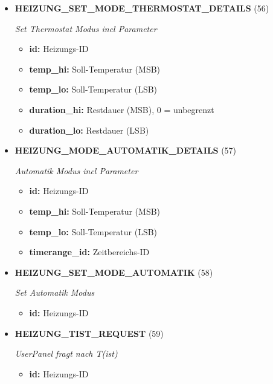 \begin{itemize}
\item \textbf{HEIZUNG\_SET\_MODE\_THERMOSTAT\_DETAILS} (56)

\textit{Set Thermostat Modus incl Parameter}

\small
\begin{itemize}
		
\item \textbf{id:} Heizungs-ID
\item \textbf{temp\_hi:} Soll-Temperatur (MSB)
\item \textbf{temp\_lo:} Soll-Temperatur (LSB)
\item \textbf{duration\_hi:} Restdauer (MSB), 0 = unbegrenzt
\item \textbf{duration\_lo:} Restdauer (LSB)
\end{itemize}
\normalsize
	
\item \textbf{HEIZUNG\_MODE\_AUTOMATIK\_DETAILS} (57)

\textit{Automatik Modus incl Parameter}

\small
\begin{itemize}
		
\item \textbf{id:} Heizungs-ID
\item \textbf{temp\_hi:} Soll-Temperatur (MSB)
\item \textbf{temp\_lo:} Soll-Temperatur (LSB)
\item \textbf{timerange\_id:} Zeitbereichs-ID
\end{itemize}
\normalsize
	
\item \textbf{HEIZUNG\_SET\_MODE\_AUTOMATIK} (58)

\textit{Set Automatik Modus}

\small
\begin{itemize}
		
\item \textbf{id:} Heizungs-ID
\end{itemize}
\normalsize
	
\item \textbf{HEIZUNG\_TIST\_REQUEST} (59)

\textit{UserPanel fragt nach T(ist)}

\small
\begin{itemize}
		
\item \textbf{id:} Heizungs-ID
\end{itemize}
\normalsize
	

\end{itemize}
